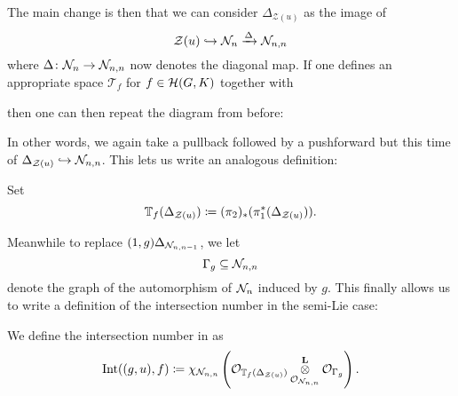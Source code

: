 The main change is then that we can consider $\Delta_{\mathcal Z(u)}$ as the image of
\[ \mathcal Z(u) \hookrightarrow \mathcal N_n \xrightarrow{\Delta} \mathcal N_{n,n} \]
where $\Delta \colon \mathcal N_n \to \mathcal N_{n,n}$ now denotes the diagonal map.
If one defines an appropriate space $\mathcal T_{f}$ for $f \in \mathcal H(G, K)$ together with
\begin{center}
\end{center}
then one can then repeat the diagram from before:
\begin{center}
\end{center}
In other words, we again take a pullback followed by a pushforward
but this time of $\Delta_{\mathcal Z(u)} \hookrightarrow \mathcal N_{n,n}$.
This lets us write an analogous definition:
\begin{definition}
  Set
  \[
    \mathbb T_f (\Delta_{\mathcal Z(u)})
    \coloneqq (\pi_2)_\ast(\pi_1^\ast(\Delta_{\mathcal Z(u)})).
  \]
\end{definition}
Meanwhile to replace $(1,g) \Delta_{\mathcal N_{n,n-1}}$, we let
\[ \Gamma_g \subseteq \mathcal N_{n,n} \]
denote the graph of the automorphism of $\mathcal N_n$ induced by $g$.
This finally allows us to write a definition of the intersection number in the semi-Lie case:
\begin{definition}
  We define the intersection number in  as
  \[
    \operatorname{Int}((g,u), f)
    \coloneqq \chi_{\mathcal N_{n,n}} \left(
      \mathcal{O}_{\mathbb T_f(\Delta_{\mathcal Z(u)})}
      \mathop{\otimes}^{\mathbf{L}}_{\mathcal{O}_{\mathcal N_{n,n}}} \mathcal{O}_{\Gamma_g} \right).
  \]
\end{definition}
